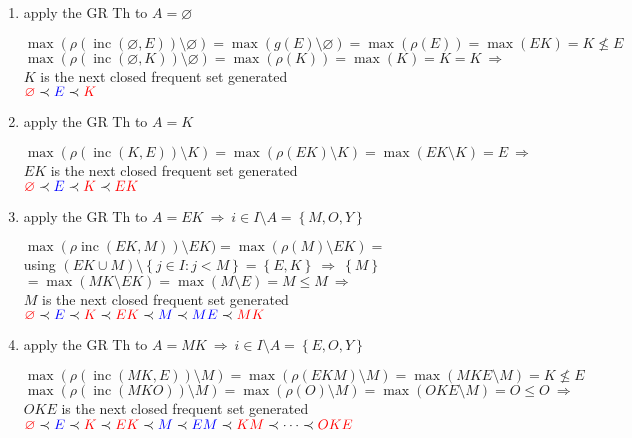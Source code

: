 \documentclass{article}
\let\emptyset\varnothing
\newcommand{\inc}{\operatorname{inc}}
\begin{document}
  \begin{enumerate}
    \item apply the GR Th to $A = \emptyset$
    \begin{center}
      $\max(\rho(\inc(\emptyset, E))\setminus\emptyset) = \max(g(E)\setminus\emptyset) = \max(\rho(E)) = \max(EK) = K \nleqslant E$
      $\max(\rho(\inc(\emptyset, K))\setminus\emptyset) = \max(\rho(K)) = \max(K) = K = K ~\Longrightarrow~$ \\
      $K$ is the next closed frequent set generated \\
      $\textcolor{red}{\emptyset} \prec \textcolor{blue}{E} \prec \textcolor{red}{K}$
    \end{center}

    \item apply the GR Th to $A = K$
    \begin{center}
      $\max(\rho(\inc(K,E))\setminus K) = \max(\rho(EK)\setminus K) = \max(EK\setminus K) = E ~\Longrightarrow~$ \\
      $EK$ is the next closed frequent set generated \\
      $\textcolor{red}{\emptyset} \prec \textcolor{blue}{E} \prec \textcolor{red}{K} \prec \textcolor{red}{EK}$
    \end{center}

    \item apply the GR Th to $A = EK ~\Longrightarrow~  i \in I \setminus A = \left\{ {M, O, Y} \right\}$
    \begin{center}
      $\max(\rho\inc(EK, M))\setminus EK) = \max(\rho(M)\setminus EK) = $ \\
      using $(EK \cup M)\setminus \left\{ {j \in I: j < M}\right\} = \left\{ {E, K} \right\} ~\Longrightarrow~ \left\{ {M}\right\}$
      $= \max(MK\setminus EK) = \max(M\setminus E) = M  \leqslant M ~\Longrightarrow~$ \\
      $M$ is the next closed frequent set generated \\
      $\textcolor{red}{\emptyset} \prec \textcolor{blue}{E} \prec \textcolor{red}{K} \prec \textcolor{red}{EK} \prec \textcolor{blue}{M} \prec \textcolor{blue}{ME} \prec \textcolor{red}{MK}$
    \end{center}

    \item apply the GR Th to $A = MK ~\Longrightarrow~  i \in I \setminus A = \left\{ {E, O, Y} \right\}$
    \begin{center}
      $\max(\rho(\inc(MK, E))\setminus M) = \max(\rho(EKM)\setminus M) = \max(MKE \setminus M) = K \nleqslant E$
      $\max(\rho(\inc(MKO))\setminus M) = \max(\rho(O)\setminus M) = \max(OKE\setminus M) = O \leqslant O ~\Longrightarrow~$ \\
      $OKE$ is the next closed frequent set generated \\
       $\textcolor{red}{\emptyset} \prec \textcolor{blue}{E} \prec \textcolor{red}{K} \prec \textcolor{red}{EK} \prec \textcolor{blue}{M} \prec \textcolor{blue}{EM} \prec \textcolor{red}{KM} \prec \dots \prec \textcolor{red}{OKE}$
    \end{center}


\end{enumerate}
\end{document}
